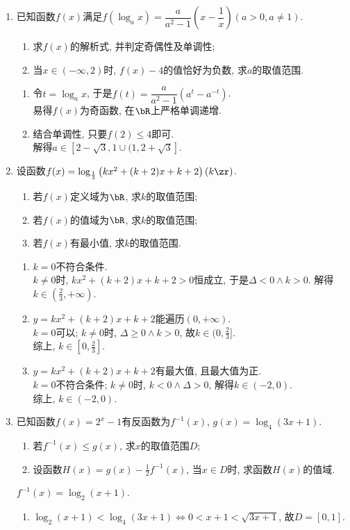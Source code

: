 \begin{enumerate}
\item 已知函数$f(x)$满足$f(\log_ax)=\dfrac{a}{a^2-1}\left(x-\dfrac{1}{x}\right)(a>0, a\neq 1)$. 
\begin{enumerate}[(1)]
\item 求$f(x)$的解析式, 并判定奇偶性及单调性; 
\item 当$x\in(-\infty,2)$时, $f(x)-4$的值恰好为负数, 求$a$的取值范围. 
\end{enumerate}
\begin{jieda}
\begin{enumerate}
\item 令$t=\log_ax$, 于是$f(t)=\dfrac{a}{a^2-1}(a^t-a^{-t})$. \\
易得$f(x)$为奇函数, 在$\bR$上严格单调递增. 
\item 结合单调性, 只要$f(2)\leq 4$即可. \\
解得$a\in[2-\sqrt{3},1\cup(1,2+\sqrt{3}]$. 
\end{enumerate}
\end{jieda}


\item 设函数$f(x)=\log_{\frac{1}{3}}\left(kx^2+(k+2)x+k+2\right)(k\zr)$. 
\begin{enumerate}[(1)]
\item 若$f(x)$定义域为$\bR$, 求$k$的取值范围;
\item 若$f(x)$的值域为$\bR$, 求$k$的取值范围;
\item 若$f(x)$有最小值, 求$k$的取值范围.
\end{enumerate}
\begin{jieda}
\begin{enumerate}[(1)]
\item $k=0$不符合条件. \\
$k\neq 0$时, $kx^2+(k+2)x+k+2>0$恒成立, 于是$\Delta<0\land k>0$. 解得$k\in(\frac{2}{3},+\infty)$. 
\item $y=kx^2+(k+2)x+k+2$能遍历$(0,+\infty)$. \\
$k=0$可以; $k\neq 0$时, $\Delta\geq 0\land k>0$, 故$k\in(0,\frac{2}{3}]$. \\
综上, $k\in[0,\frac{2}{3}]$. 
\item $y=kx^2+(k+2)x+k+2$有最大值, 且最大值为正. \\
$k=0$不符合条件; $k\neq 0$时, $k<0\land \Delta>0$, 解得$k\in(-2,0)$. \\
综上, $k\in(-2,0)$. 
\end{enumerate}
\end{jieda}


\item 已知函数$f(x)=2^x-1$有反函数为$f^{-1}(x)$, $g(x)=\log_4(3x+1)$. 
\begin{enumerate}[(1)]
\item 若$f^{-1}(x)\leq g(x)$, 求$x$的取值范围$D$; 
\item 设函数$H(x)=g(x)-\frac{1}{2}f^{-1}(x)$, 当$x\in D$时, 求函数$H(x)$的值域. 
\end{enumerate}
\begin{jieda}
$f^{-1}(x)=\log_2(x+1)$. 
\begin{enumerate}[(1)]
\item $\log_2(x+1)<\log_4(3x+1)\iff 0<x+1<\sqrt{3x+1}$, 故$D=[0,1]$. 


\end{enumerate}
\end{jieda}
\end{enumerate}
